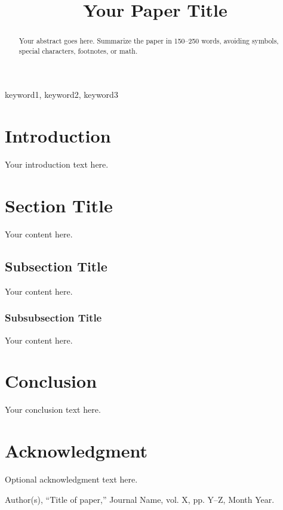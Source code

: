 \documentclass[conference,a4paper]{IEEEtran}
\begin{document}
\title{Your Paper Title}

\author{
}

\maketitle

\begin{abstract}
Your abstract goes here. Summarize the paper in 150–250 words, avoiding symbols, special characters, footnotes, or math.
\end{abstract}

\begin{IEEEkeywords}
keyword1, keyword2, keyword3
\end{IEEEkeywords}

\section{Introduction}
Your introduction text here.

\section{Section Title}
Your content here.

\subsection{Subsection Title}
Your content here.

\subsubsection{Subsubsection Title}
Your content here.

\section{Conclusion}
Your conclusion text here.

\section*{Acknowledgment}
Optional acknowledgment text here.

\begin{thebibliography}{00}
 Author(s), ``Title of paper,'' Journal Name, vol. X, pp. Y–Z, Month Year.
\end{thebibliography}
\end{document}
